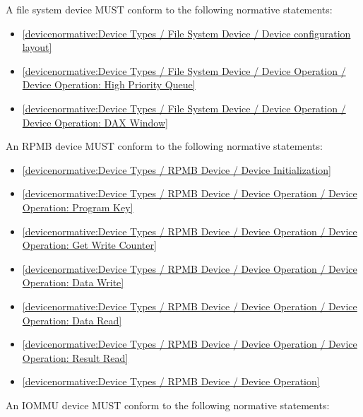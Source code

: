 A file system device MUST conform to the following normative statements:

\begin{itemize}
\item \ref{devicenormative:Device Types / File System Device / Device configuration layout}
\item \ref{devicenormative:Device Types / File System Device / Device Operation / Device Operation: High Priority Queue}
\item \ref{devicenormative:Device Types / File System Device / Device Operation / Device Operation: DAX Window}
\end{itemize}

\label{sec:Conformance / Device Conformance / RPMB Device Conformance}

An RPMB device MUST conform to the following normative statements:

\begin{itemize}
\item \ref{devicenormative:Device Types / RPMB Device / Device Initialization}
\item \ref{devicenormative:Device Types / RPMB Device / Device Operation / Device Operation: Program Key}
\item \ref{devicenormative:Device Types / RPMB Device / Device Operation / Device Operation: Get Write Counter}
\item \ref{devicenormative:Device Types / RPMB Device / Device Operation / Device Operation: Data Write}
\item \ref{devicenormative:Device Types / RPMB Device / Device Operation / Device Operation: Data Read}
\item \ref{devicenormative:Device Types / RPMB Device / Device Operation / Device Operation: Result Read}
\item \ref{devicenormative:Device Types / RPMB Device / Device Operation}
\end{itemize}

\label{sec:Conformance / Device Conformance / IOMMU Device Conformance}

An IOMMU device MUST conform to the following normative statements:

